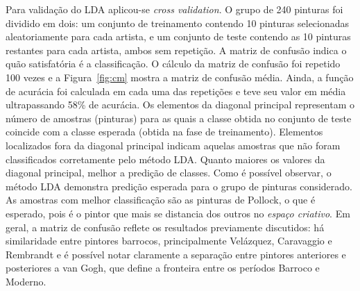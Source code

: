 Para validação do LDA aplicou-se \textit{cross validation}. O grupo de
240 pinturas foi dividido em dois: um conjunto de treinamento contendo
10 pinturas selecionadas aleatoriamente para cada artista, e um
conjunto de teste contendo as 10 pinturas restantes para cada artista,
ambos sem repetição. A matriz de confusão indica o quão satisfatória é
a classificação. O cálculo da matriz de confusão foi repetido 100
vezes e a Figura~\ref{fig:cm} mostra a matriz de confusão
média. Ainda, a função de acurácia foi calculada em cada uma das
repetições e teve seu valor em média ultrapassando 58\% de
acurácia. Os elementos da diagonal principal representam o número de
amostras (pinturas) para as quais a classe obtida no conjunto de teste
coincide com a classe esperada (obtida na fase de
treinamento). Elementos localizados fora da diagonal principal indicam
aquelas amostras que não foram classificados corretamente pelo método
LDA. Quanto maiores os valores da diagonal principal, melhor a
predição de classes. Como é possível observar, o método LDA demonstra
predição esperada para o grupo de pinturas considerado. As amostras
com melhor classificação são as pinturas de Pollock, o que é esperado,
pois é o pintor que mais se distancia dos outros no \textit{espaço
  criativo}. Em geral, a matriz de confusão reflete os resultados
previamente discutidos: há similaridade entre pintores barrocos,
principalmente Velázquez, Caravaggio e Rembrandt e é possível notar
claramente a separação entre pintores anteriores e posteriores a van
Gogh, que define a fronteira entre os períodos Barroco e Moderno.

